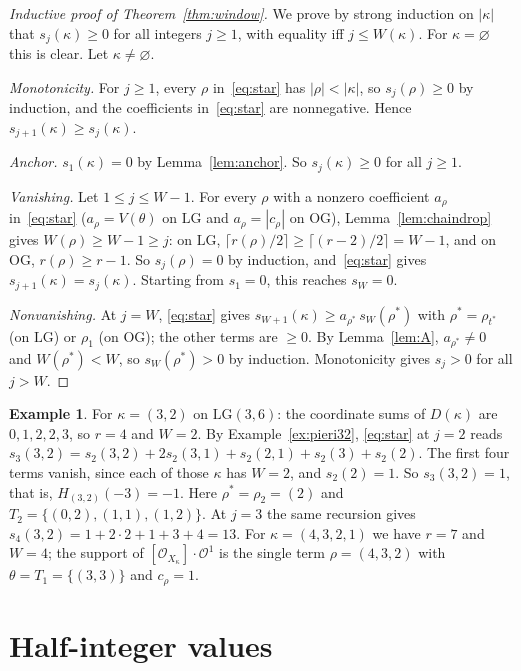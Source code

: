 \documentclass[11pt]{amsart}
\theoremstyle{definition}
\newtheorem{example}[theorem]{Example}
\theoremstyle{remark}
\newcommand{\LG}{\mathrm{LG}}
\newcommand{\OG}{\mathrm{OG}}
\newcommand{\cO}{\mathcal{O}}
\begin{document}
\begin{proof}[Inductive proof of Theorem~\ref{thm:window}]
We prove by strong induction on $|\kappa|$ that $s_j(\kappa)\ge0$ for all integers $j\ge1$,
with equality iff $j\le W(\kappa)$. For $\kappa=\varnothing$ this is clear. Let
$\kappa\ne\varnothing$.

\emph{Monotonicity.} For $j\ge1$, every $\rho$ in~\eqref{eq:star} has $|\rho|<|\kappa|$, so
$s_j(\rho)\ge0$ by induction, and the coefficients in~\eqref{eq:star} are nonnegative. Hence
$s_{j+1}(\kappa)\ge s_j(\kappa)$.

\emph{Anchor.} $s_1(\kappa)=0$ by Lemma~\ref{lem:anchor}. So $s_j(\kappa)\ge0$ for all $j\ge1$.

\emph{Vanishing.} Let $1\le j\le W-1$. For every $\rho$ with a nonzero coefficient
$a_\rho$ in~\eqref{eq:star} ($a_\rho=V(\theta)$ on $\LG$ and $a_\rho=|c_\rho|$ on $\OG$),
Lemma~\ref{lem:chaindrop} gives $W(\rho)\ge W-1\ge j$: on $\LG$,
$\lceil r(\rho)/2\rceil\ge\lceil(r-2)/2\rceil=W-1$, and on $\OG$, $r(\rho)\ge r-1$. So
$s_j(\rho)=0$ by induction, and~\eqref{eq:star} gives $s_{j+1}(\kappa)=s_j(\kappa)$. Starting
from $s_1=0$, this reaches $s_W=0$.

\emph{Nonvanishing.} At $j=W$, \eqref{eq:star} gives
$s_{W+1}(\kappa)\ge a_{\rho^*}\,s_W(\rho^*)$ with $\rho^*=\rho_{t^*}$ (on $\LG$) or $\rho_1$
(on $\OG$); the other terms are $\ge0$. By Lemma~\ref{lem:A}, $a_{\rho^*}\ne0$ and
$W(\rho^*)<W$, so $s_W(\rho^*)>0$ by induction. Monotonicity gives $s_j>0$ for all $j>W$.
\end{proof}

\begin{example}
For $\kappa=(3,2)$ on $\LG(3,6)$: the coordinate sums of $D(\kappa)$ are $0,1,2,2,3$, so
$r=4$ and $W=2$. By Example~\ref{ex:pieri32}, \eqref{eq:star} at $j=2$ reads
$s_3(3,2)=s_2(3,2)+2s_2(3,1)+s_2(2,1)+s_2(3)+s_2(2)$. The first four terms vanish, since each of
those $\kappa$ has $W=2$, and $s_2(2)=1$. So $s_3(3,2)=1$, that is, $H_{(3,2)}(-3)=-1$. Here
$\rho^*=\rho_2=(2)$ and $T_2=\{(0,2),(1,1),(1,2)\}$. At $j=3$ the same recursion gives
$s_4(3,2)=1+2\cdot2+1+3+4=13$. For $\kappa=(4,3,2,1)$ we have $r=7$ and $W=4$; the support of
$[\cO_{X_\kappa}]\cdot\cO^1$ is the single term $\rho=(4,3,2)$ with $\theta=T_1=\{(3,3)\}$ and
$c_\rho=1$.
\end{example}

\section{Half-integer values}\label{sec:half}
\end{document}
